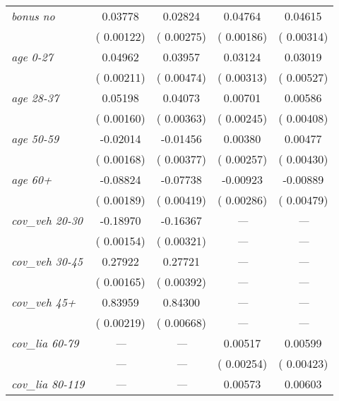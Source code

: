 {\begin{ThreePartTable}
\begin{longtable}{lcccc}
    \textit{bonus no} &  0.03778 &  0.02824 &  0.04764 &  0.04615 \\
    & \scriptsize{( 0.00122)} & \scriptsize{( 0.00275)} & \scriptsize{( 0.00186)} & \scriptsize{( 0.00314)} \\
    \textit{age 0-27} &  0.04962 &  0.03957 &  0.03124 &  0.03019 \\
    & \scriptsize{( 0.00211)} & \scriptsize{( 0.00474)} & \scriptsize{( 0.00313)} & \scriptsize{( 0.00527)} \\
    \textit{age 28-37} &  0.05198 &  0.04073 &  0.00701 &  0.00586 \tnote{\dag\dag} \\
    & \scriptsize{( 0.00160)} & \scriptsize{( 0.00363)} & \scriptsize{( 0.00245)} & \scriptsize{( 0.00408)} \\
    \textit{age 50-59} & -0.02014 & -0.01456 &  0.00380 \tnote{\dag\dag} &  0.00477 \tnote{\dag\dag\dag} \\
    & \scriptsize{( 0.00168)} & \scriptsize{( 0.00377)} & \scriptsize{( 0.00257)} & \scriptsize{( 0.00430)} \\
    \textit{age 60+} & -0.08824 & -0.07738 & -0.00923 & -0.00889 \tnote{\dag} \\
    & \scriptsize{( 0.00189)} & \scriptsize{( 0.00419)} & \scriptsize{( 0.00286)} & \scriptsize{( 0.00479)} \\
    \textit{cov\_veh 20-30} & -0.18970 & -0.16367 & \textit{---} & \textit{---} \\
    & \scriptsize{( 0.00154)} & \scriptsize{( 0.00321)} & \scriptsize{\textit{---}} & \scriptsize{\textit{---}} \\
    \textit{cov\_veh 30-45} &  0.27922 &  0.27721 & \textit{---} & \textit{---} \\
    & \scriptsize{( 0.00165)} & \scriptsize{( 0.00392)} & \scriptsize{\textit{---}} & \scriptsize{\textit{---}} \\
    \textit{cov\_veh 45+} &  0.83959 &  0.84300 & \textit{---} & \textit{---} \\
    & \scriptsize{( 0.00219)} & \scriptsize{( 0.00668)} & \scriptsize{\textit{---}} & \scriptsize{\textit{---}} \\
    \textit{cov\_lia 60-79} & \textit{---} & \textit{---} &  0.00517 \tnote{\dag} &  0.00599 \tnote{\dag\dag} \\
    & \scriptsize{\textit{---}} & \scriptsize{\textit{---}} & \scriptsize{( 0.00254)} & \scriptsize{( 0.00423)} \\
    \textit{cov\_lia 80-119} & \textit{---} & \textit{---} &  0.00573 \tnote{\dag} &  0.00603 \tnote{\dag\dag} \\

\end{longtable}
\end{ThreePartTable}}

